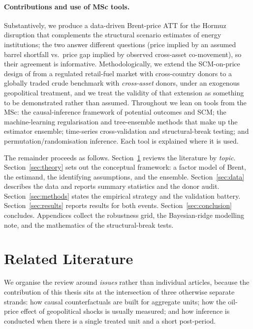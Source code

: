 \documentclass[11pt,a4paper]{article}
\begin{document}
\paragraph{Contributions and use of MSc tools.} Substantively, we produce a
data-driven Brent-price ATT for the Hormuz disruption that complements the structural
scenario estimates of energy institutions; the two answer different questions (price
implied by an assumed barrel shortfall vs.\ price gap implied by observed cross-asset
co-movement), so their agreement is informative. Methodologically, we extend the
SCM-on-price design of \citet{becker2021} from a regulated retail-fuel market with
cross-country donors to a globally traded crude benchmark with \emph{cross-asset}
donors, under an exogenous geopolitical treatment, and we treat the validity of that
extension as something to be demonstrated rather than assumed. Throughout we lean on
tools from the MSc: the causal-inference framework of potential outcomes and SCM; the
machine-learning regularisation and tree-ensemble methods that make up the estimator
ensemble; time-series cross-validation and structural-break testing; and
permutation/randomisation inference. Each tool is explained where it is used.

The remainder proceeds as follows. Section~\ref{sec:lit} reviews the literature by
\emph{topic}. Section~\ref{sec:theory} sets out the conceptual framework: a factor
model of Brent, the estimand, the identifying assumptions, and the ensemble.
Section~\ref{sec:data} describes the data and reports summary statistics and the donor
audit. Section~\ref{sec:methods} states the empirical strategy and the validation
battery. Section~\ref{sec:results} reports results for both events.
Section~\ref{sec:conclusion} concludes. Appendices collect the robustness grid, the
Bayesian-ridge modelling note, and the mathematics of the structural-break tests.

\section{Related Literature}\label{sec:lit}
We organise the review around \emph{issues} rather than individual articles, because
the contribution of this thesis sits at the intersection of three otherwise separate
strands: how causal counterfactuals are built for aggregate units; how the oil-price
effect of geopolitical shocks is usually measured; and how inference is conducted when
there is a single treated unit and a short post-period.
\end{document}
